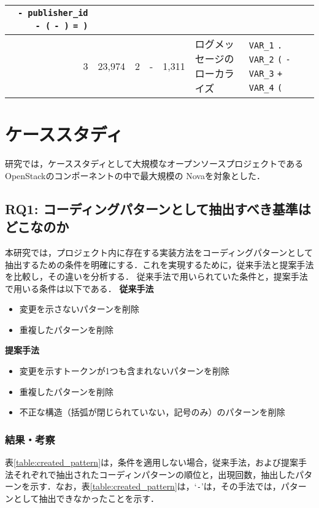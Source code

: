 \documentclass[twocolumn]{jarticle} %
\newcommand{\RQone}{コーディングパターンとして抽出すべき基準はどこなのか}
\begin{document}
\begin{table}[t]
{\begin{tabular}{r|rrr|r|p{2cm}|p{4.5cm}}
        \colorbox{lightgray!50}{\texttt{- publisher\_id}} \colorbox{lightgray!50}{\texttt{- (}} \colorbox{lightgray!50}{\texttt{- )}} \colorbox{lightgray!50}{\texttt{= )}}
        \\ \hline
                3 & 23,974    & 2   & -  & 1,311  & ログメッセージのローカライズ& 
                \colorbox{lightgray!50}{\texttt{VAR\_1}} \colorbox{lightgray!50}{\texttt{.}} \colorbox{lightgray!50}{\texttt{VAR\_2}} \colorbox{lightgray!50}{\texttt{(}}
        \newline
        \colorbox{lightgray!50}{\texttt{- VAR\_3}} \colorbox{lightgray!50}{\texttt{+ VAR\_4}}
        \colorbox{lightgray!50}{\texttt{(}}
                \\
             \hline
        \end{tabular}
        }
\end{table}

\section{ケーススタディ}
研究では，ケーススタディとして大規模なオープンソースプロジェクトであるOpenStackのコンポーネントの中で最大規模の Novaを対象とした．
\subsection{RQ1: \RQone}
本研究では，プロジェクト内に存在する実装方法をコーディングパターンとして抽出するための条件を明確にする．これを実現するために，従来手法と提案手法を比較し，その違いを分析する．
従来手法で用いられていた条件と，提案手法で用いる条件は以下である．
\textbf{従来手法}
\begin{itemize}
    \item 変更を示さないパターンを削除
    \item 重複したパターンを削除
\end{itemize}
\textbf{提案手法}
\begin{itemize}
    \item 変更を示すトークンが1つも含まれないパターンを削除
    \item 重複したパターンを削除
    \item 不正な構造（括弧が閉じられていない，記号のみ）のパターンを削除
\end{itemize}
\subsubsection{結果・考察}
表\ref{table:created_pattern}は，条件を適用しない場合，従来手法，および提案手法それぞれで抽出されたコーディンパターンの順位と，出現回数，抽出したパターンを示す．なお，表\ref{table:created_pattern}は，`\texttt{-}'は，その手法では，パターンとして抽出できなかったことを示す．
\end{document}
